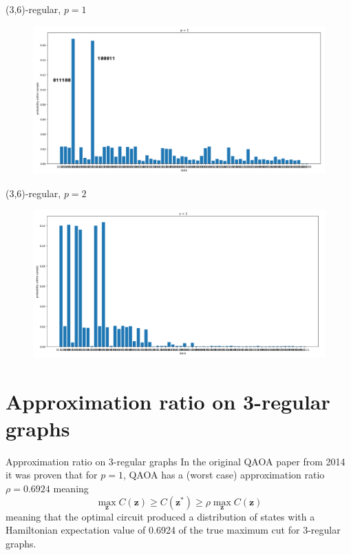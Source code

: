 \documentclass{beamer}
\begin{document}
\begin{frame}{(3,6)-regular, $p = 1$}
\begin{figure}
\centering
\includegraphics[scale=0.3,left]{figures/regular(3,6)-p1.png}
\end{figure}
\end{frame}

\begin{frame}{(3,6)-regular, $p = 2$}
\begin{figure}
\centering
\includegraphics[scale=0.3,left]{figures/regular(3,6)-p2.png}
\end{figure}
\end{frame}

\section{Approximation ratio on 3-regular graphs}
\begin{frame}{Approximation ratio on 3-regular graphs}
	In the original QAOA paper from 2014 it was proven that for $p=1$, QAOA has a (worst case) approximation ratio $\rho = 0.6924$ meaning
	\begin{equation}
	\max_{\mathbf{z}} C(\mathbf{z}) \geq C(\mathbf{z}^*) \geq \rho \max_{\mathbf{z}} C(\mathbf{z})
	\end{equation}
	meaning that the optimal circuit produced a distribution of states with a Hamiltonian expectation value of 0.6924 of the true maximum cut for 3-regular graphs.
\end{frame}
\end{document}
